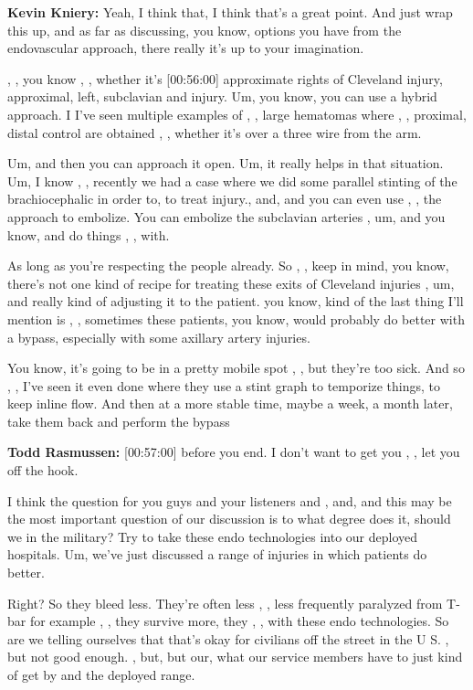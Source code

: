 \documentclass[
]{book}
\begin{document}
\textbf{Kevin Kniery:} Yeah, I think that, I think that's a great point. And
just wrap this up, and as far as discussing, you know, options you have
from the endovascular approach, there really it's up to your
imagination.

, , you know , , whether it's {[}00:56:00{]} approximate rights of Cleveland
injury, approximal, left, subclavian and injury. Um, you know, you can
use a hybrid approach. I I've seen multiple examples of , , large
hematomas where , , proximal, distal control are obtained , , whether
it's over a three wire from the arm.

Um, and then you can approach it open. Um, it really helps in that
situation. Um, I know , , recently we had a case where we did some
parallel stinting of the brachiocephalic in order to, to treat injury.,
and, and you can even use , , the approach to embolize. You can embolize
the subclavian arteries , um, and you know, and do things , , with.

As long as you're respecting the people already. So , , keep in mind,
you know, there's not one kind of recipe for treating these exits of
Cleveland injuries , um, and really kind of adjusting it to the patient.
you know, kind of the last thing I'll mention is , , sometimes these
patients, you know, would probably do better with a bypass, especially
with some axillary artery injuries.

You know, it's going to be in a pretty mobile spot , , but they're too
sick. And so , , I've seen it even done where they use a stint graph to
temporize things, to keep inline flow. And then at a more stable time,
maybe a week, a month later, take them back and perform the bypass

\textbf{Todd Rasmussen:} {[}00:57:00{]} before you end. I don't want to get you ,
, let you off the hook.

I think the question for you guys and your listeners and , and, and this
may be the most important question of our discussion is to what degree
does it, should we in the military? Try to take these endo technologies
into our deployed hospitals. Um, we've just discussed a range of
injuries in which patients do better.

Right? So they bleed less. They're often less , , less frequently
paralyzed from T-bar for example , , they survive more, they , , with
these endo technologies. So are we telling ourselves that that's okay
for civilians off the street in the U S. , but not good enough. , but,
but our, what our service members have to just kind of get by and the
deployed range.
\end{document}
